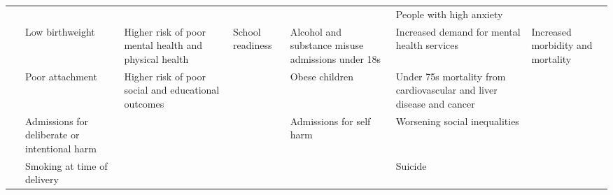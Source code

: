\begin{table*}[]
\begin{tabular}{@{}M{4mm}M{26mm}M{30mm}M{30mm}M{30mm}M{80mm}M{26mm}@{}}
        \ & \ & \ & \ & \ & People with high anxiety& \ \\
        \cmidrule(r){2-7}
         & Low birthweight & Higher risk of poor mental health and physical health & School readiness & Alcohol and substance misuse admissions under 18s & Increased demand for mental health services & Increased morbidity and mortality \\
        \ & Poor attachment & Higher risk of poor social and educational outcomes & \ & Obese children & Under 75s mortality from cardiovascular and liver disease and cancer & \ \\
        \ & Admissions for deliberate or intentional harm & \ & \ & Admissions for self harm & Worsening social inequalities & \ \\
        \ & Smoking at time of delivery & \ & \ & \ & Suicide& \ \\
        \bottomrule
    \end{tabular}
\end{table*}
